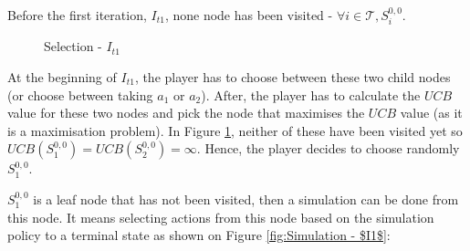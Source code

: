 \documentclass[conference]{IEEEtran}
\begin{document}
Before the first iteration, $I_{t1}$, none node has been visited - $\forall i \in \mathcal{T}, S^{0,0}_{i}$.
\begin{figure}
    \centering
    \caption{Selection - $I_{t1}$}
    \label{fig:Expansion of the tree from the root node}
\end{figure}

At the beginning of $I_{t1}$, the player has to choose between these two child nodes (or choose between taking $a_1$ or $a_2$). After, the player has to calculate the $UCB$ value for these two nodes and pick the node that maximises the $UCB$ value (as it is a maximisation problem).
In Figure \ref{fig:Expansion of the tree from the root node}, neither of these have been visited yet so $UCB(S^{0,0}_1)=UCB(S^{0,0}_2)=\infty$. Hence, the player decides to choose randomly $S^{0,0}_1$.

$S^{0,0}_1$ is a leaf node that has not been visited, then a simulation can be done from this node. It means selecting actions from this node based on the simulation policy to a terminal state as shown on Figure \ref{fig:Simulation - $I1$}:
\end{document}
